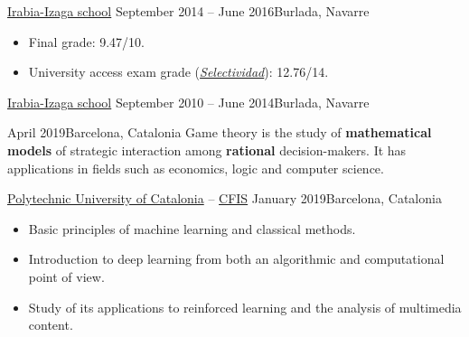 \documentclass[10pt, a4paper, ragged2e]{../altacv}
\begin{document}
\divider

{\href{https://www.irabia-izaga.org}{Irabia-Izaga school}}
{September 2014 -- June 2016}{Burlada, Navarre}
\begin{itemize}
  \item Final grade: 9.47/10.
  \item University access exam grade
  (\href{https://en.wikipedia.org/wiki/Selectividad}{\textit{Selectividad}}):
  12.76/14.
\end{itemize}

\divider

{\href{https://www.irabia-izaga.org}{Irabia-Izaga school}}
{September 2010 -- June 2014}{Burlada, Navarre}

\medskip
{}

{April 2019}{Barcelona, Catalonia}
Game theory is the study of \textbf{mathematical models} of strategic
interaction among \textbf{rational} decision-makers. It has applications in
fields such as economics, logic and computer science.

\vspace{.1cm}
\divider
\vspace{.15cm}

{\href{https://www.upc.edu/en}{Polytechnic University of Catalonia} --
  \href{https://cfis.upc.edu}{CFIS}}
{January 2019}{Barcelona, Catalonia}
\begin{itemize}
  \item Basic principles of machine learning and classical methods.
  \item Introduction to deep learning from both an algorithmic and computational
  point of view.
  \item Study of its applications to reinforced learning and the analysis of
  multimedia content.
\end{itemize}


\clearpage

\end{document}
